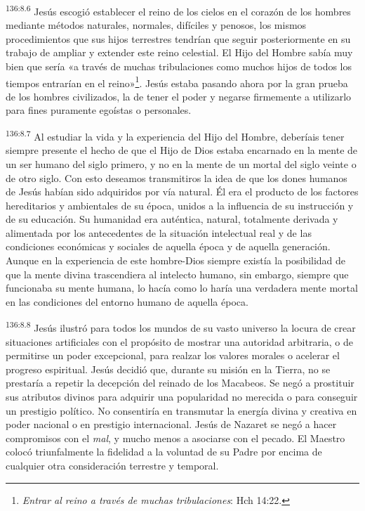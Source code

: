 \par
\textsuperscript{136:8.6} Jesús escogió establecer el reino de los cielos en el corazón de los hombres mediante métodos naturales, normales, difíciles y penosos, los mismos procedimientos que sus hijos terrestres tendrían que seguir posteriormente en su trabajo de ampliar y extender este reino celestial. El Hijo del Hombre sabía muy bien que sería «a través de muchas tribulaciones como muchos hijos de todos los tiempos entrarían en el reino»\footnote{\textit{Entrar al reino a través de muchas tribulaciones}: Hch 14:22.}. Jesús estaba pasando ahora por la gran prueba de los hombres civilizados, la de tener el poder y negarse firmemente a utilizarlo para fines puramente egoístas o personales.

\par
\textsuperscript{136:8.7} Al estudiar la vida y la experiencia del Hijo del Hombre, deberíais tener siempre presente el hecho de que el Hijo de Dios estaba encarnado en la mente de un ser humano del siglo primero, y no en la mente de un mortal del siglo veinte o de otro siglo. Con esto deseamos transmitiros la idea de que los dones humanos de Jesús habían sido adquiridos por vía natural. Él era el producto de los factores hereditarios y ambientales de su época, unidos a la influencia de su instrucción y de su educación. Su humanidad era auténtica, natural, totalmente derivada y alimentada por los antecedentes de la situación intelectual real y de las condiciones económicas y sociales de aquella época y de aquella generación. Aunque en la experiencia de este hombre-Dios siempre existía la posibilidad de que la mente divina trascendiera al intelecto humano, sin embargo, siempre que funcionaba su mente humana, lo hacía como lo haría una verdadera mente mortal en las condiciones del entorno humano de aquella época.

\par
\textsuperscript{136:8.8} Jesús ilustró para todos los mundos de su vasto universo la locura de crear situaciones artificiales con el propósito de mostrar una autoridad arbitraria, o de permitirse un poder excepcional, para realzar los valores morales o acelerar el progreso espiritual. Jesús decidió que, durante su misión en la Tierra, no se prestaría a repetir la decepción del reinado de los Macabeos. Se negó a prostituir sus atributos divinos para adquirir una popularidad no merecida o para conseguir un prestigio político. No consentiría en transmutar la energía divina y creativa en poder nacional o en prestigio internacional. Jesús de Nazaret se negó a hacer compromisos con el \textit{mal}, y mucho menos a asociarse con el pecado. El Maestro colocó triunfalmente la fidelidad a la voluntad de su Padre por encima de cualquier otra consideración terrestre y temporal.

